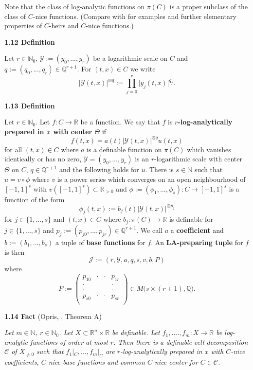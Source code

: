 \documentclass[12pt]{article}
\def\vs{\vspace}
\begin{document}
\vs{0.5cm}
Note that the class of log-analytic functions on $\pi(C)$ is a proper subclass of the class of $C$-nice functions. (Compare with \cite{10} for examples and further elementary properties of $C$-heirs and $C$-nice functions.)

\vs{0.5cm}
{\bf1.12 Definition}

\vs{0.1cm}
Let $r \in \mathbb{N}_0$, $\mathcal{Y}:=(y_0,...,y_r)$ be a logarithmic scale on $C$ and $q:=(q_0,...,q_r) \in \mathbb{Q}^{r+1}$. For $(t,x) \in C$ we write 
$$\vert{\mathcal{Y}(t,x)}\vert^{\otimes q}:=\prod_{j=0}^r \vert{y_j(t,x)}\vert^{q_j}.$$

\vs{0.2cm}
{\bf1.13 Definition}

\vs{0.1cm}
Let $r \in \mathbb{N}_0$. Let $f:C \to \mathbb{R}$ be a function. We say that $f$ is \textbf{$r$-log-analytically prepared in $x$ with center $\Theta$} if
$$f(t,x)=a(t) \vert{\mathcal{Y}(t,x)}\vert^{\otimes q}u(t,x)$$
for all $(t,x) \in C$ where $a$ is a definable function on $\pi(C)$ which vanishes identically or has no zero, $\mathcal{Y}=(y_0,...,y_r)$ is an $r$-logarithmic scale with center $\Theta$ on $C$, $q \in \mathbb{Q}^{r+1}$ and the following holds for $u$. There is $s \in \mathbb{N}$ such that $u=v \circ \phi$ where $v$ is a power series which converges on an open neighbourhood of $[-1,1]^s$ with $v([-1,1]^s) \subset \mathbb{R}_{>0}$ and $\phi:=(\phi_1,...,\phi_s):C \to [-1,1]^s$ is a function of the form 
$$\phi_j(t,x):=b_j(t)\vert{\mathcal{Y}(t,x)}\vert^{\otimes p_j}$$
for $j \in \{1,...,s\}$ and $(t,x) \in C$ where $b_j:\pi(C) \to \mathbb{R}$ is definable for $j \in \{1,...,s\}$ and $p_j:=(p_{j0},...,p_{jr}) \in \mathbb{Q}^{r+1}$. We call $a$ a \textbf{coefficient} and $b:=(b_1,...,b_s)$ a tuple of \textbf{base functions} for $f$. An \textbf{LA-preparing tuple} for $f$ is then
$$\mathcal{J}:=(r,\mathcal{Y},a,q,s,v,b,P)$$
where
$$P:=\left(\begin{array}{cccc}
p_{10}&\cdot&\cdot&p_{1r}\\
\cdot&& &\cdot\\
\cdot&& &\cdot\\
p_{s0}&\cdot&\cdot&p_{sr}\\
\end{array}\right)\in M\big(s\times (r+1),\mathbb{Q}).$$

\vs{0.5cm}
{\bf1.14 Fact} (Opris, \cite{10}, Theorem A)

\vs{0.1cm}
{\it
Let $m \in \mathbb{N}$, $r \in \mathbb{N}_0$. Let $X \subset \mathbb{R}^n \times \mathbb{R}$ be definable. Let $f_1,....,f_m:X \to \mathbb{R}$ be log-analytic functions of order at most $r$. Then there is a definable cell decomposition $\mathcal{C}$ of $X_{\neq 0}$ such that $f_1|_C,...,f_m|_C$ are $r$-log-analytically prepared in $x$ with $C$-nice coefficients, $C$-nice base functions and common $C$-nice center for $C \in \mathcal{C}$.}
\end{document}
